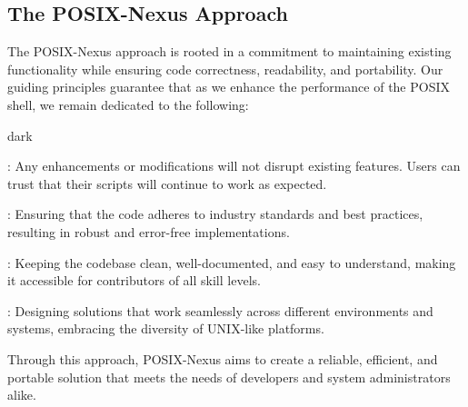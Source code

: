 \subsection{The POSIX-Nexus Approach}
\label{sec:introduction:sub:approach}
The POSIX-Nexus approach is rooted in a commitment to maintaining existing functionality while ensuring code correctness, readability, and portability.
Our guiding principles guarantee that as we enhance the performance of the POSIX shell, we remain dedicated to the following:
\bigskip
\begin{baseBoxOne}{}{dark}
    \begin{posnexItemize} 
        \item[\sA] : Any enhancements or modifications will not disrupt existing features. Users can trust that their scripts will continue to work as expected.
        \item[\sA] : Ensuring that the code adheres to industry standards and best practices, resulting in robust and error-free implementations.
        \item[\sA] : Keeping the codebase clean, well-documented, and easy to understand, making it accessible for contributors of all skill levels.
        \item[\sA] : Designing solutions that work seamlessly across different environments and systems, embracing the diversity of UNIX-like platforms.
    \end{posnexItemize}
\end{baseBoxOne}
\bigskip
Through this approach, POSIX-Nexus aims to create a reliable, efficient, and portable solution that meets the needs of developers and system administrators alike.

